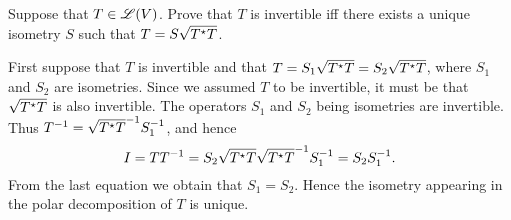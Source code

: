 \begin{exercise}
Suppose that $T \in \mathscr{L}(V)$. Prove that $T$ is invertible iff there exists
a unique isometry $S$ such that $T = S \sqrt{T^{\star} T}$.
\end{exercise}
\begin{solution}
First suppose that $T$ is invertible and that $T = S_1 \sqrt{T^{\star} T} =
S_2 \sqrt{T^{\star} T}$, where $S_1$ and $S_2$ are isometries. Since we assumed $T$
to be invertible, it must be that $\sqrt{T^{\star} T}$ is also invertible. The
operators $S_1$ and $S_2$ being isometries are invertible. Thus
$T^{-1} = \sqrt{T^{\star} T}^{-1} S_1^{-1}$,
and hence
\[
    I = T T^{-1} = S_2 \sqrt{T^{\star} T} \sqrt{T^{\star} T}^{-1} S_1^{-1} = S_2 S_1^{-1}.
\]
From the last equation we obtain that $S_1 = S_2$. Hence the isometry appearing
in the polar decomposition of $T$ is unique.

\end{solution}
